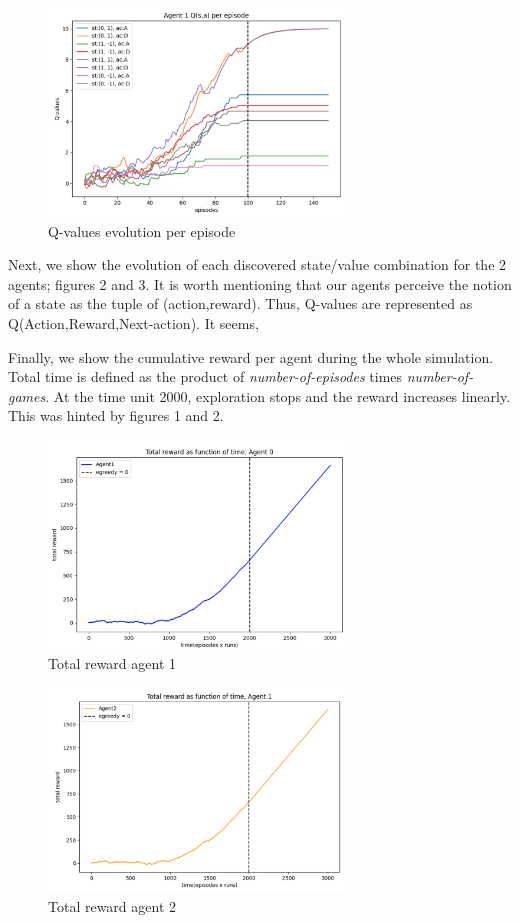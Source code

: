 \documentclass[10pt,a4paper,twocolumn]{article}
\begin{document}
	\begin{figure}[ht!]
		\centering
		\includegraphics[width=80mm]{q_values_agent1}
		\caption{Q-values evolution per episode \label{overflow}}
	\end{figure}
	
	Next, we show the evolution of each discovered state/value combination for the 2 agents; figures 2 and 3. It is worth mentioning that our agents perceive the notion of a state as the tuple of (action,reward). Thus, Q-values are represented as Q(Action,Reward,Next-action). It seems,
	
	
	Finally, we show the cumulative reward per agent during the whole simulation. Total time is defined as the product of \textit{number-of-episodes} times \textit{number-of-games}. At the time unit 2000, exploration stops and the reward increases linearly. This was hinted by figures 1 and 2.
	
	
	\begin{figure}[ht!]
		\centering
		\includegraphics[width=80mm]{total_reward_agent0}
		\caption{Total reward agent 1 \label{overflow}}
	\end{figure}

	\begin{figure}[ht!]
	\centering
		\includegraphics[width=80mm]{total_reward_agent1}
		\caption{Total reward agent 2 \label{overflow}}
	\end{figure}
\end{document}
